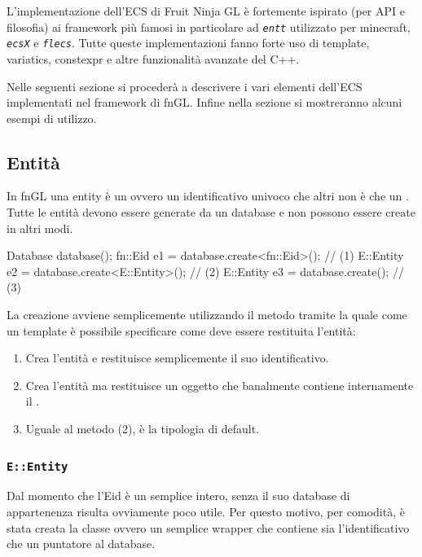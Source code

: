 \begin{emptyBox}
L'implementazione dell'ECS di Fruit Ninja GL è fortemente ispirato (per API e filosofia) ai framework più famosi in particolare ad \texttt{\textit{entt}} utilizzato per minecraft, \texttt{\textit{ecsX}} e \texttt{\textit{flecs}}. Tutte queste implementazioni fanno forte uso di template, variatics, constexpr e altre funzionalità avanzate del C++.
\end{emptyBox}

Nelle seguenti sezione si procederà a descrivere i vari elementi dell'ECS implementati nel framework di fnGL. Infine nella sezione  si mostreranno alcuni esempi di utilizzo.

\subsection{Entità}
In fnGL una entity è un  ovvero un identificativo univoco che altri non è che un . Tutte le entità devono essere generate da un database e non possono essere create in altri modi.

\begin{cpp}
 Database database();
 fn::Eid e1 = database.create<fn::Eid>();        // (1)
 E::Entity e2 = database.create<E::Entity>();    // (2)
 E::Entity e3 = database.create();               // (3)
\end{cpp}

La creazione avviene semplicemente utilizzando il metodo  tramite la quale come un template è possibile specificare come deve essere restituita l'entità:
\begin{enumerate}
\item Crea l'entità e restituisce semplicemente il suo identificativo.
\item Crea l'entità ma restituisce un oggetto  che banalmente contiene internamente il .
\item Uguale al metodo (2),  è la tipologia di default.
\end{enumerate}


\subsubsection{\texttt{E::Entity}}
Dal momento che l'Eid è un semplice intero, senza il suo database di appartenenza risulta ovviamente poco utile. Per questo motivo, per comodità, è stata creata la classe  ovvero un semplice wrapper che contiene sia l'identificativo che un puntatore al database. 

